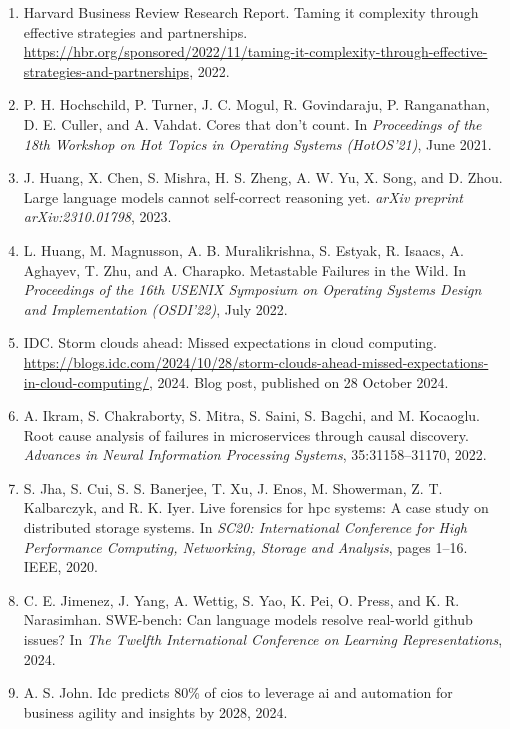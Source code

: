 \documentclass[10pt,UTF8,fontset=fandol]{ctexart}
\begin{document}
\begin{enumerate}[leftmargin=2em,itemsep=2pt]
\item Harvard Business Review Research Report. Taming it complexity through effective strategies and partnerships. \url{https://hbr.org/sponsored/2022/11/taming-it-complexity-through-effective-strategies-and-partnerships}, 2022.

\item P. H. Hochschild, P. Turner, J. C. Mogul, R. Govindaraju, P. Ranganathan, D. E. Culler, and A. Vahdat. Cores that don't count. In \textit{Proceedings of the 18th Workshop on Hot Topics in Operating Systems (HotOS'21)}, June 2021.

\item J. Huang, X. Chen, S. Mishra, H. S. Zheng, A. W. Yu, X. Song, and D. Zhou. Large language models cannot self-correct reasoning yet. \textit{arXiv preprint arXiv:2310.01798}, 2023.

\item L. Huang, M. Magnusson, A. B. Muralikrishna, S. Estyak, R. Isaacs, A. Aghayev, T. Zhu, and A. Charapko. Metastable Failures in the Wild. In \textit{Proceedings of the 16th USENIX Symposium on Operating Systems Design and Implementation (OSDI'22)}, July 2022.

\item IDC. Storm clouds ahead: Missed expectations in cloud computing. \url{https://blogs.idc.com/2024/10/28/storm-clouds-ahead-missed-expectations-in-cloud-computing/}, 2024. Blog post, published on 28 October 2024.

\item A. Ikram, S. Chakraborty, S. Mitra, S. Saini, S. Bagchi, and M. Kocaoglu. Root cause analysis of failures in microservices through causal discovery. \textit{Advances in Neural Information Processing Systems}, 35:31158--31170, 2022.

\item S. Jha, S. Cui, S. S. Banerjee, T. Xu, J. Enos, M. Showerman, Z. T. Kalbarczyk, and R. K. Iyer. Live forensics for hpc systems: A case study on distributed storage systems. In \textit{SC20: International Conference for High Performance Computing, Networking, Storage and Analysis}, pages 1--16. IEEE, 2020.

\item C. E. Jimenez, J. Yang, A. Wettig, S. Yao, K. Pei, O. Press, and K. R. Narasimhan. SWE-bench: Can language models resolve real-world github issues? In \textit{The Twelfth International Conference on Learning Representations}, 2024.

\item A. S. John. Idc predicts 80\% of cios to leverage ai and automation for business agility and insights by 2028, 2024.


\end{enumerate}
\end{document}
